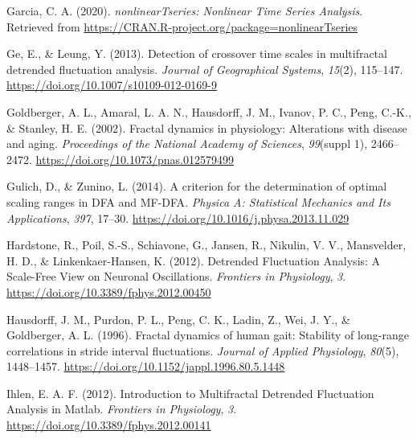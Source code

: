 \documentclass[
  man]{apa6}
\newlength{\cslhangindent}
\newlength{\cslentryspacingunit} %
\newenvironment{CSLReferences}[2] %
 {%
  \setlength{\parindent}{0pt}
  \ifodd #1
  \let\oldpar\par
  \def\par{\hangindent=\cslhangindent\oldpar}
  \fi
  \setlength{\parskip}{#2\cslentryspacingunit}
 }%
 {}
\begin{document}
\begin{CSLReferences}{1}{0}
\leavevmode{}%
Garcia, C. A. (2020). \emph{{nonlinearTseries}: {Nonlinear} {Time} {Series} {Analysis}}. Retrieved from \url{https://CRAN.R-project.org/package=nonlinearTseries}

\leavevmode{}%
Ge, E., \& Leung, Y. (2013). Detection of crossover time scales in multifractal detrended fluctuation analysis. \emph{Journal of Geographical Systems}, \emph{15}(2), 115--147. \url{https://doi.org/10.1007/s10109-012-0169-9}

\leavevmode{}%
Goldberger, A. L., Amaral, L. A. N., Hausdorff, J. M., Ivanov, P. C., Peng, C.-K., \& Stanley, H. E. (2002). Fractal dynamics in physiology: {Alterations} with disease and aging. \emph{Proceedings of the National Academy of Sciences}, \emph{99}(suppl 1), 2466--2472. \url{https://doi.org/10.1073/pnas.012579499}

\leavevmode{}%
Gulich, D., \& Zunino, L. (2014). A criterion for the determination of optimal scaling ranges in {DFA} and {MF}-{DFA}. \emph{Physica A: Statistical Mechanics and Its Applications}, \emph{397}, 17--30. \url{https://doi.org/10.1016/j.physa.2013.11.029}

\leavevmode{}%
Hardstone, R., Poil, S.-S., Schiavone, G., Jansen, R., Nikulin, V. V., Mansvelder, H. D., \& Linkenkaer-Hansen, K. (2012). Detrended {Fluctuation} {Analysis}: {A} {Scale}-{Free} {View} on {Neuronal} {Oscillations}. \emph{Frontiers in Physiology}, \emph{3}. \url{https://doi.org/10.3389/fphys.2012.00450}

\leavevmode{}%
Hausdorff, J. M., Purdon, P. L., Peng, C. K., Ladin, Z., Wei, J. Y., \& Goldberger, A. L. (1996). Fractal dynamics of human gait: Stability of long-range correlations in stride interval fluctuations. \emph{Journal of Applied Physiology}, \emph{80}(5), 1448--1457. \url{https://doi.org/10.1152/jappl.1996.80.5.1448}

\leavevmode{}%
Ihlen, E. A. F. (2012). Introduction to {Multifractal} {Detrended} {Fluctuation} {Analysis} in {Matlab}. \emph{Frontiers in Physiology}, \emph{3}. \url{https://doi.org/10.3389/fphys.2012.00141}


\end{CSLReferences}
\end{document}
